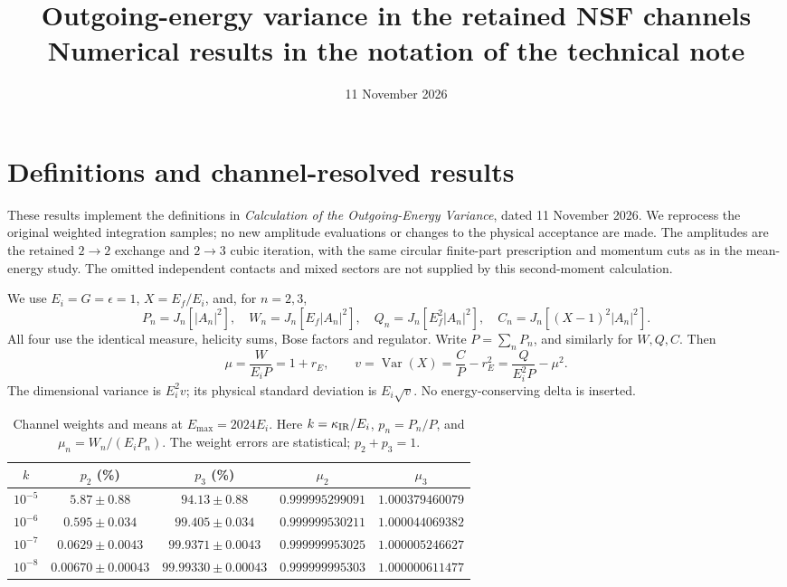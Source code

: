 \documentclass[10pt,a4paper]{article}
\title{Outgoing-energy variance in the retained NSF channels\\
\large Numerical results in the notation of the technical note}
\author{}
\date{11 November 2026}
\newcommand{\Var}{\operatorname{Var}}
\begin{document}
\maketitle
\vspace{-6mm}

\section{Definitions and channel-resolved results}
These results implement the definitions in \emph{Calculation of the
Outgoing-Energy Variance}, dated 11 November 2026. We reprocess the original
weighted integration samples; no new amplitude evaluations or changes to
the physical acceptance are made. The amplitudes are the retained
$2\to2$ exchange and $2\to3$ cubic iteration, with the same circular
finite-part prescription and momentum cuts as in the mean-energy study.
The omitted independent contacts and mixed sectors are not supplied by
this second-moment calculation.

We use $E_i=G=\epsilon=1$, $X=E_f/E_i$, and, for $n=2,3$,
\[
 P_n=J_n[|A_n|^2],\quad W_n=J_n[E_f|A_n|^2],\quad
 Q_n=J_n[E_f^2|A_n|^2],\quad C_n=J_n[(X-1)^2|A_n|^2].
\]
All four use the identical measure, helicity sums, Bose factors and
regulator. Write $P=\sum_nP_n$, and similarly for $W,Q,C$. Then
\begin{equation}
 \mu=\frac{W}{E_iP}=1+r_E,\qquad
 v=\Var(X)=\frac{C}{P}-r_E^2
 =\frac{Q}{E_i^2P}-\mu^2.
 \label{eq:variance}
\end{equation}
The dimensional variance is $E_i^2v$; its physical standard deviation is
$E_i\sqrt v$. No energy-conserving delta is inserted.

\begin{table}[h!]
\centering\small
\caption{Channel weights and means at $E_{\max}=2024E_i$.
Here $k=\kappa_{\rm IR}/E_i$, $p_n=P_n/P$, and $\mu_n=W_n/(E_iP_n)$.
The weight errors are statistical; $p_2+p_3=1$.}
\begin{tabular}{ccccc}
\toprule
$k$ & $p_2$ (\%) & $p_3$ (\%) & $\mu_2$ & $\mu_3$\\
\midrule
$10^{-5}$ & $5.87\pm0.88$ & $94.13\pm0.88$ & $0.999995299091$ & $1.000379460079$\\
$10^{-6}$ & $0.595\pm0.034$ & $99.405\pm0.034$ & $0.999999530211$ & $1.000044069382$\\
$10^{-7}$ & $0.0629\pm0.0043$ & $99.9371\pm0.0043$ & $0.999999953025$ & $1.000005246627$\\
$10^{-8}$ & $0.00670\pm0.00043$ & $99.99330\pm0.00043$ & $0.999999995303$ & $1.000000611477$\\
\bottomrule
\end{tabular}
\end{table}
\end{document}
